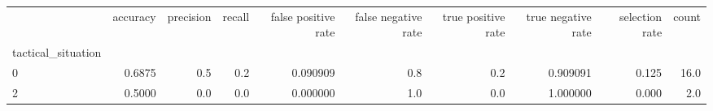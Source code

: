 \begin{tabular}{lrrrrrrrrr}
\toprule
{} &  accuracy &  precision &  recall &  false positive rate &  false negative rate &  true positive rate &  true negative rate &  selection rate &  count \\
tactical\_situation &           &            &         &                      &                      &                     &                     &                 &        \\
\midrule
0                  &    0.6875 &        0.5 &     0.2 &             0.090909 &                  0.8 &                 0.2 &            0.909091 &           0.125 &   16.0 \\
2                  &    0.5000 &        0.0 &     0.0 &             0.000000 &                  1.0 &                 0.0 &            1.000000 &           0.000 &    2.0 \\
\bottomrule
\end{tabular}
